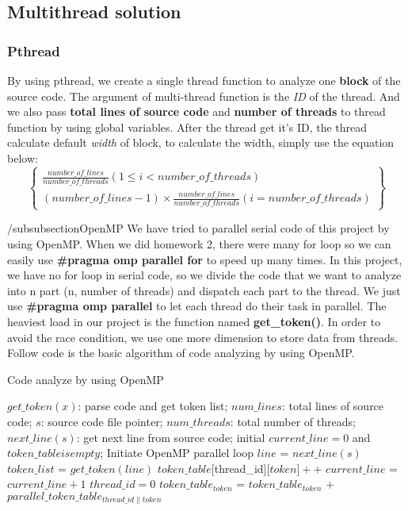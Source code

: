 \documentclass{acm_proc_article-sp}
\begin{document}
\subsection{Multithread solution}
\subsubsection{Pthread}
	By using pthread, we create a single thread function to analyze one \textbf{block}
	of the source code. The argument of multi-thread function is the \textit{ID} of the thread.
	And we also pass \textbf{total lines of source code} and \textbf{number of threads} to
	thread function by using global variables.
	After the thread get it's ID, the thread calculate default \textit{width} of block, to calculate
	the width, simply use the equation below:
	\begin{displaymath}
	\begin{Bmatrix}
	\frac{number\_of\_lines}{number\_of\_threads} (1\leq i< number\_of\_threads)\\ 
	(number\_of\_lines - 1)\times \frac{number\_of\_lines}{number\_of\_threads} (i= number\_of\_threads)
	\end{Bmatrix}
	\end{displaymath}
	
/subsubsection{OpenMP}
We have tried to parallel serial code of this project by using OpenMP. When we did homework 2, there were many for loop so we can easily use \textbf{\#pragma omp parallel for} to speed up many times. In this project, we have no for loop in serial code, so we divide the code that we want to analyze into n part (n, number of threads) and dispatch each part to the thread. We just use \textbf{\#pragma omp parallel} to let each thread do their task in parallel. The heaviest load in our project is the function named \textbf{get\_token()}. In order to avoid the race condition, we use one more dimension to store data from threads.
Follow code is the basic algorithm of code analyzing by using OpenMP.
\begin{algorithm}[h]
		\caption{Code analyze by using OpenMP}
		\begin{algorithmic}[1]
			\Require
				$get\_token(x)$: parse code and get token list;
				$num\_lines$: total lines of source code;
				$s$: source code file pointer;
				$num\_threads$: total number of threads;
				$next\_line(s)$: get next line from source code;
			\State initial $current\_line=0$ and $token\_table is empty$;
			\State Initiate OpenMP parallel loop
			\Repeat
				\State $line$ = $next\_line(s)$
				\State $token\_list$ = $get\_token(line)$
					\State $token\_table[$thread\_id][$token]++$
				\EndFor
				\State $current\_line$ = $current\_line + 1$
				\State $thread\_id = 0$
					\State $token\_table_{token}$ = $token\_table_{token}$ + $parallel\_token\_table_{thread\_id\|token}$
				\EndWhile
			\EndFor
		\end{algorithmic}
\end{algorithm}
\end{document}
